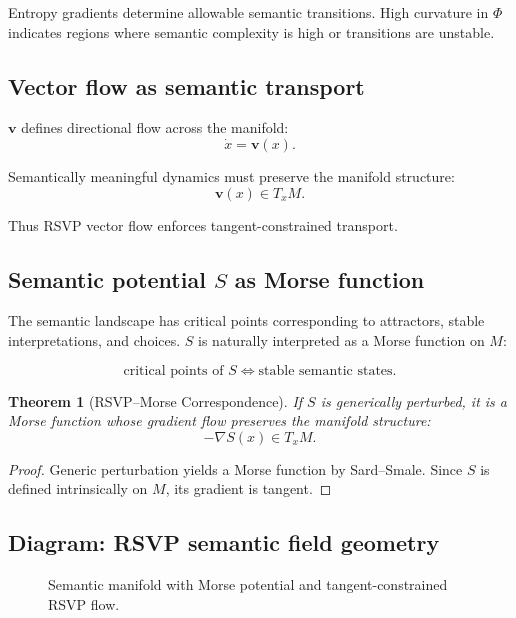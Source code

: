\documentclass[11pt,a4paper,twocolumn]{article}
\newtheorem{theorem}{Theorem}[section]
\begin{document}
Entropy gradients determine allowable semantic transitions.  
High curvature in $\Phi$ indicates regions where semantic complexity is
high or transitions are unstable.

\subsection{Vector flow as semantic transport}

$\mathbf{v}$ defines directional flow across the manifold:
\[
\dot{x} = \mathbf{v}(x).
\]

Semantically meaningful dynamics must preserve the manifold structure:
\[
\mathbf{v}(x) \in T_x M.
\]

Thus RSVP vector flow enforces tangent-constrained transport.

\subsection{Semantic potential $S$ as Morse function}

The semantic landscape has critical points corresponding to attractors,
stable interpretations, and choices.  
$S$ is naturally interpreted as a Morse function on $M$:

\[
\text{critical points of } S \Longleftrightarrow \text{stable semantic states.}
\]

\begin{theorem}[RSVP–Morse Correspondence]
If $S$ is generically perturbed, it is a Morse function whose gradient
flow preserves the manifold structure:  
\[
-\nabla S(x) \in T_x M.
\]
\end{theorem}

\begin{proof}
Generic perturbation yields a Morse function by Sard–Smale.  
Since $S$ is defined intrinsically on $M$, its gradient is tangent.
\end{proof}

\subsection{Diagram: RSVP semantic field geometry}

\begin{figure}[H]
\centering
{}
\caption{Semantic manifold with Morse potential and tangent-constrained RSVP flow.}
\end{figure}
\end{document}
